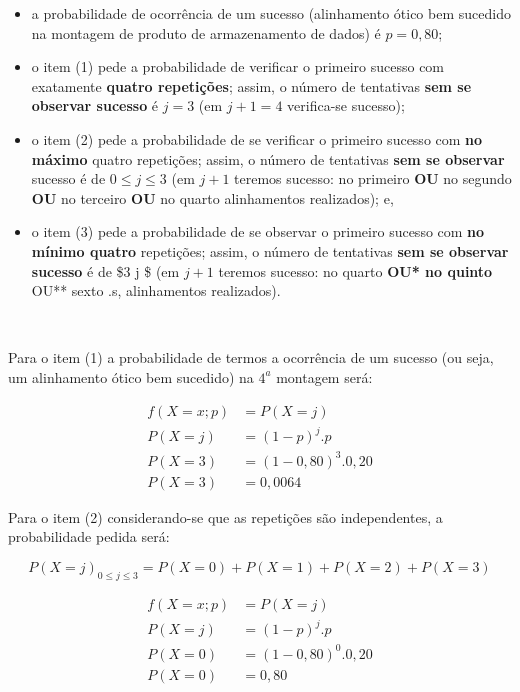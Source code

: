 \documentclass[
]{book}
\providecommand{\tightlist}{%
  \setlength{\itemsep}{0pt}\setlength{\parskip}{0pt}}
\begin{document}
\begin{itemize}
\tightlist
\item
  a probabilidade de ocorrência de um sucesso (alinhamento ótico bem sucedido na montagem de produto de armazenamento de dados) é \(p=0,80\);\\
\item
  o item (1) pede a probabilidade de verificar o primeiro sucesso com exatamente \textbf{quatro repetições}; assim, o número de tentativas \textbf{sem se observar sucesso} é \(j=3\) (em \(j+1=4\) verifica-se sucesso);\\
\item
  o item (2) pede a probabilidade de se verificar o primeiro sucesso com \textbf{no máximo} quatro repetições; assim, o número de tentativas \textbf{sem se observar} sucesso é de \(0 \le j \le 3\) (em \(j+1\) teremos sucesso: no primeiro \textbf{OU} no segundo \textbf{OU} no terceiro \textbf{OU} no quarto alinhamentos realizados); e,\\
\item
  o item (3) pede a probabilidade de se observar o primeiro sucesso com \textbf{no mínimo quatro} repetições; assim, o número de tentativas \textbf{sem se observar sucesso} é de \$3 \le j \le \infty \$ (em \(j+1\) teremos sucesso: no quarto \textbf{OU* no quinto }OU** sexto .s, alinhamentos realizados).
\end{itemize}

~

Para o item (1) a probabilidade de termos a ocorrência de um sucesso (ou seja, um alinhamento ótico bem sucedido) na \(4^{a}\) montagem será:

\hfill\break

\begin{align*}
f(X=x; p) & = P(X=j) \\
P(X=j)  & = (1-p)^{j} . p \\
P(X=3) & = (1-0,80)^{3} . 0,20 \\
P(X=3) & = 0,0064
\end{align*}

\hfill\break

Para o item (2) considerando-se que as repetições são independentes, a probabilidade pedida será:

\hfill\break

\[
P(X=j)_{0 \le j \le 3} = P(X=0) + P(X=1) + P(X=2) + P(X=3)
\]

\hfill\break

\begin{align*}
f(X=x; p) & = P(X=j) \\
P(X=j) & =  (1-p)^{j} . p \\
P(X=0) & =  (1-0,80)^{0} . 0,20 \\
P(X=0) &  =  0,80 
\end{align*}
\end{document}
